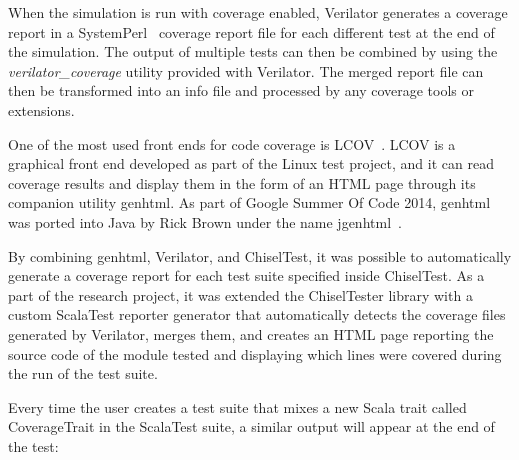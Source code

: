 When the simulation is run with coverage enabled, Verilator generates a coverage
report in a SystemPerl~\cite{SystemPerl} coverage report file for each different
test at the end of the simulation. The output of multiple tests can then be
combined by using the \textit{verilator\_coverage} utility provided with
Verilator. The merged report file can then be transformed into an info file and
processed by any coverage tools or extensions.

One of the most used front ends for code coverage is LCOV~\cite{Lcov}. LCOV is a
graphical front end developed as part of the Linux test project, and it can read
coverage results and display them in the form of an HTML page through its
companion utility genhtml. As part of Google Summer Of Code 2014, genhtml was
ported into Java by Rick Brown under the name jgenhtml~\cite{jgenhtml}.

By combining genhtml, Verilator, and ChiselTest, it was possible to
automatically generate a coverage report for each test suite specified inside
ChiselTest. As a part of the research project, it was extended the ChiselTester
library with a custom ScalaTest reporter generator that automatically detects
the coverage files generated by Verilator, merges them, and creates an HTML page
reporting the source code of the module tested and displaying which lines were
covered during the run of the test suite.

Every time the user creates a test suite that mixes a new Scala trait called
CoverageTrait in the ScalaTest suite, a similar output will appear at the end of
the test:

